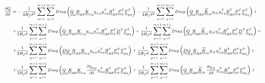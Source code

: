 \begin{equation}
\scriptsize
\begin{split}
\frac{\partial \underline{G}}{\partial \delta}=&-\frac{1}{2R_{f}\delta^{2}}\sum_{p=1}^{m+1}\sum_{q=1}^{m+1}Diag\left(\underline{\underline{Q}}_{\delta}\underline{\underline{R}}_{\Delta\theta}\underline{\underline{K}}_{xy}\underline{u}_{xy}\underline{u}_{xy}^{T}\underline{\underline{R}}_{\Delta\theta}^{T}\underline{\underline{P}}_{\delta}^{T}\underline{\underline{T}}_{pq}^{T}\right)-\frac{1}{2R_{f}\delta^{2}}\sum_{p=1}^{m+1}\sum_{q=1}^{m+1}Diag\left(\underline{\underline{Q}}_{\delta}\underline{\underline{R}}_{\Delta\theta}\underline{\underline{\widetilde{K}}}_{N}\underline{u}_{N}\underline{u}_{xy}^{T}\underline{\underline{R}}_{\Delta\theta}^{T}\underline{\underline{P}}_{\delta}^{T}\underline{\underline{T}}_{pq}^{T}\right)+\\
+&\frac{1}{2R_{f}\delta}\sum_{p=1}^{m+1}\sum_{q=1}^{m+1}Diag\left(\underline{\underline{Q}}_{\delta}\underline{\underline{R}}_{\Delta\theta}\underline{\underline{K}}_{xy}\underline{u}_{xy}\underline{u}_{xy}^{T}\underline{\underline{R}}_{\Delta\theta}^{T}\underline{\underline{P}}_{\delta}^{T}\underline{\underline{D}}^{T}\underline{\underline{T}}_{pq}^{T}\right)+\frac{1}{2R_{f}\delta}\sum_{p=1}^{m+1}\sum_{q=1}^{m+1}Diag\left(\underline{\underline{Q}}_{\delta}\underline{\underline{R}}_{\Delta\theta}\underline{\underline{\widetilde{K}}}_{N}\underline{u}_{N}\underline{u}_{xy}^{T}\underline{\underline{R}}_{\Delta\theta}^{T}\underline{\underline{P}}_{\delta}^{T}\underline{\underline{D}}^{T}\underline{\underline{T}}_{pq}^{T}\right)+\\
+&\frac{1}{2R_{f}\delta}\sum_{p=1}^{m+1}\sum_{q=1}^{m+1}Diag\left(\underline{\underline{D}}\underline{\underline{Q}}_{\delta}\underline{\underline{R}}_{\Delta\theta}\underline{\underline{K}}_{xy}\underline{u}_{xy}\underline{u}_{xy}^{T}\underline{\underline{R}}_{\Delta\theta}^{T}\underline{\underline{P}}_{\delta}^{T}\underline{\underline{T}}_{pq}^{T}\right)+\frac{1}{2R_{f}\delta}\sum_{p=1}^{m+1}\sum_{q=1}^{m+1}Diag\left(\underline{\underline{D}}\underline{\underline{Q}}_{\delta}\underline{\underline{R}}_{\Delta\theta}\underline{\underline{\widetilde{K}}}_{N}\underline{u}_{N}\underline{u}_{xy}^{T}\underline{\underline{R}}_{\Delta\theta}^{T}\underline{\underline{P}}_{\delta}^{T}\underline{\underline{T}}_{pq}^{T}\right)+\\
+&\frac{1}{2R_{f}\delta}\sum_{p=1}^{m+1}\sum_{q=1}^{m+1}Diag\left(\underline{\underline{Q}}_{\delta}\underline{\underline{R}}_{\Delta\theta}\underline{\underline{K}}_{xy}\frac{\partial \underline{u}_{xy}}{\partial \delta}\underline{u}_{xy}^{T}\underline{\underline{R}}_{\Delta\theta}^{T}\underline{\underline{P}}_{\delta}^{T}\underline{\underline{T}}_{pq}^{T}\right)+\frac{1}{2R_{f}\delta}\sum_{p=1}^{m+1}\sum_{q=1}^{m+1}Diag\left(\underline{\underline{Q}}_{\delta}\underline{\underline{R}}_{\Delta\theta}\underline{\underline{\widetilde{K}}}_{N}\frac{\partial \underline{u}_{N}}{\partial \delta}\underline{u}_{xy}^{T}\underline{\underline{R}}_{\Delta\theta}^{T}\underline{\underline{P}}_{\delta}^{T}\underline{\underline{T}}_{pq}^{T}\right)+\\

\end{split}
\end{equation}
